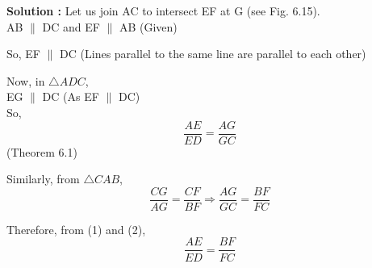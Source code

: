 \documentclass[a4paper,12pt]{article}
\begin{document}
\begin{minipage}{0.5\textwidth}
\textcolor{ncertblue}{\textbf{Solution :}} Let us join AC to intersect EF at G (see Fig. 6.15).\\

AB $\parallel$ DC and EF $\parallel$ AB \hfill (Given)

So, EF $\parallel$ DC \hfill (Lines parallel to the same line are parallel to each other)

Now, in $\triangle ADC$,\\
EG $\parallel$ DC \hfill (As EF $\parallel$ DC)\\

So, \[
\frac{AE}{ED} = \frac{AG}{GC} \tag{1}
\] \hfill (Theorem 6.1)

Similarly, from $\triangle CAB$,
\[
\frac{CG}{AG} = \frac{CF}{BF}
\Rightarrow \frac{AG}{GC} = \frac{BF}{FC}
\]

Therefore, from (1) and (2),
\[
\frac{AE}{ED} = \frac{BF}{FC}
\]
\end{minipage}
\hfill
\end{document}
